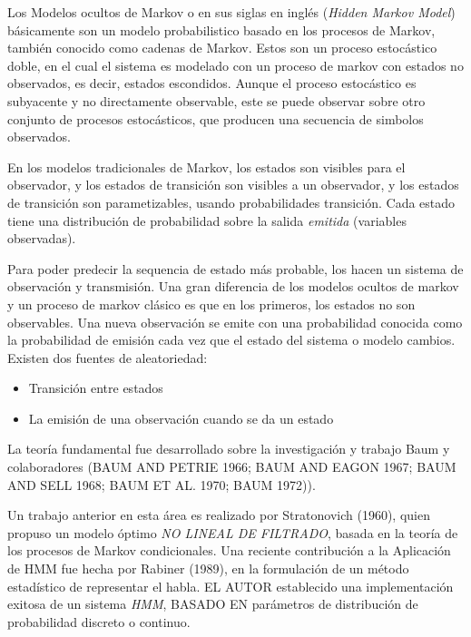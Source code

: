 


Los Modelos ocultos de Markov o en sus siglas en inglés \HMM (\emph{Hidden Markov Model})  básicamente son un modelo probabilistico basado en los procesos de Markov, también conocido como cadenas de Markov. Estos \HMM son un proceso estocástico doble, en el cual el sistema es modelado con un proceso de markov con estados no observados, es decir, estados escondidos. Aunque el proceso estocástico es subyacente y no directamente observable, este se puede observar sobre otro conjunto de procesos estocásticos, que producen una secuencia de simbolos observados.

En los modelos tradicionales de Markov, los estados son visibles para el observador, y los estados de transición son visibles a un observador, y los estados de transición son parametizables, usando probabilidades transición.
Cada estado tiene una distribución de probabilidad sobre la salida \emph{emitida} (variables observadas).

Para poder predecir la sequencia de estado más probable, los \HMM hacen un sistema de observación y transmisión. Una gran diferencia de los modelos ocultos de markov y un proceso de markov clásico es que en los primeros, los estados no son observables.  Una nueva observación se emite con una probabilidad conocida como la probabilidad de emisión cada vez que el estado del sistema o modelo cambios. Existen dos fuentes de aleatoriedad:

\begin{itemize}
	\setlength{\itemsep}{1pt}
	\setlength{\parskip}{0pt}
	\setlength{\parsep}{0pt}
	\item Transición entre estados
	\item La emisión de una observación cuando se da un estado
\end{itemize}







La teoría fundamental fue desarrollado sobre la investigación y trabajo  Baum y colaboradores (BAUM AND PETRIE 1966; BAUM AND EAGON 1967; BAUM AND SELL 1968; BAUM ET AL. 1970; BAUM 1972)). 

Un trabajo anterior en esta área es realizado por  Stratonovich (1960), quien propuso un modelo óptimo \emph{NO LINEAL DE FILTRADO}, basada en la teoría de los procesos de Markov condicionales. Una reciente contribución a la Aplicación de HMM fue hecha por Rabiner (1989), en la formulación de un método estadístico de representar el habla. EL AUTOR establecido una implementación exitosa de un sistema \emph{HMM}, BASADO EN parámetros de distribución de probabilidad discreto o continuo.


